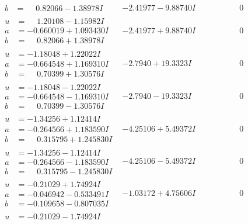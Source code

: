 \documentclass[1p]{elsarticle_modified}
\theoremstyle{definition}
\begin{document}
$$\begin{array}{c|c|c}
\begin{aligned}
b &= \phantom{-}0.82066 - 1.38978 I\end{aligned}
 & -2.41977 - 9.88740 I & \phantom{-0.000000 } 0 \\ \hline\begin{aligned}
u &= \phantom{-}1.20108 - 1.15982 I \\
a &= -0.660019 + 1.093430 I \\
b &= \phantom{-}0.82066 + 1.38978 I\end{aligned}
 & -2.41977 + 9.88740 I & \phantom{-0.000000 } 0 \\ \hline\begin{aligned}
u &= -1.18048 + 1.22022 I \\
a &= -0.664548 + 1.169310 I \\
b &= \phantom{-}0.70399 + 1.30576 I\end{aligned}
 & -2.7940 + 19.3323 I & \phantom{-0.000000 } 0 \\ \hline\begin{aligned}
u &= -1.18048 - 1.22022 I \\
a &= -0.664548 - 1.169310 I \\
b &= \phantom{-}0.70399 - 1.30576 I\end{aligned}
 & -2.7940 - 19.3323 I & \phantom{-0.000000 } 0 \\ \hline\begin{aligned}
u &= -1.34256 + 1.12414 I \\
a &= -0.264566 + 1.183590 I \\
b &= \phantom{-}0.315795 + 1.245830 I\end{aligned}
 & -4.25106 + 5.49372 I & \phantom{-0.000000 } 0 \\ \hline\begin{aligned}
u &= -1.34256 - 1.12414 I \\
a &= -0.264566 - 1.183590 I \\
b &= \phantom{-}0.315795 - 1.245830 I\end{aligned}
 & -4.25106 - 5.49372 I & \phantom{-0.000000 } 0 \\ \hline\begin{aligned}
u &= -0.21029 + 1.74924 I \\
a &= -0.046942 - 0.533491 I \\
b &= -0.109658 - 0.807035 I\end{aligned}
 & -1.03172 + 4.75606 I & \phantom{-0.000000 } 0 \\ \hline\begin{aligned}
u &= -0.21029 - 1.74924 I \\

\end{aligned}
\end{array}$$
\end{document}
